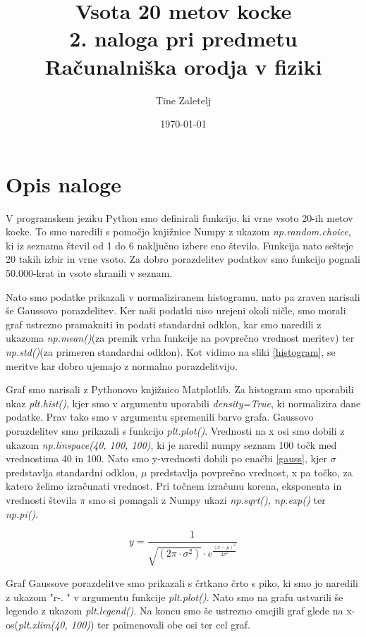 \documentclass[titlepage]{article}
\title{Vsota 20 metov kocke\\\large 2. naloga pri predmetu Računalniška orodja v fiziki}
\author{Tine Zaletelj}
\date{\today}
\begin{document}
\maketitle

\section{Opis naloge}
V programskem jeziku Python smo definirali funkcijo, ki vrne vsoto 20-ih metov kocke. To smo naredili s pomočjo knjižnice Numpy z ukazom {\it np.random.choice}, ki iz seznama števil od 1 do 6 naključno izbere eno število. Funkcija nato sešteje 20 takih izbir in vrne vsoto. Za dobro porazdelitev podatkov smo funkcijo pognali 50.000-krat in vsote shranili v seznam.

Nato smo podatke prikazali v normaliziranem histogramu, nato pa zraven narisali še Gaussovo porazdelitev. Ker naši podatki niso urejeni okoli ničle, smo morali graf ustrezno pramakniti in podati standardni odklon, kar smo naredili z ukazoma {\it np.mean()}(za premik vrha funkcije na povprečno vrednost meritev) ter {\it np.std()}(za primeren standardni odklon). Kot vidimo na sliki \ref{histogram}, se meritve kar dobro ujemajo z normalno porazdelitvijo.

Graf smo narisali z Pythonovo knjižnico Matplotlib. Za histogram smo uporabili ukaz {\it plt.hist()}, kjer smo v argumentu uporabili {\it density=True}, ki normalizira dane podatke. Prav tako smo v argumentu spremenili barvo grafa. Gaussovo porazdelitev smo prikazali s funkcijo {\it plt.plot()}. Vrednosti na x osi smo dobili z ukazom {\it np.linspace(40, 100, 100)}, ki je naredil numpy seznam 100 točk med vrednostima 40 in 100. Nato smo y-vrednosti dobili po enačbi \ref{gauss}, kjer $\sigma$ predstavlja standardni odklon, $\mu$ predstavlja povprečno vrednost, x pa točko, za katero želimo izračunati vrednost. Pri točnem izračunu korena, eksponenta in vrednosti števila $\pi$ smo si pomagali z Numpy ukazi {\it np.sqrt(), np.exp()} ter {\it np.pi()}.

\begin{equation}
    y = \frac{1}{\sqrt{(2\pi\cdot\sigma^2)}\cdot e^\frac{(x-\mu)^2}{2\sigma^2}}\label{gauss}
\end{equation}

Graf Gaussove porazdelitve smo prikazali s črtkano črto s piko, ki smo jo naredili z ukazom "r-. " v argumentu funkcije {\it plt.plot()}. Nato smo na grafu ustvarili še legendo z ukazom {\it plt.legend()}. Na koncu smo še ustrezno omejili graf glede na x-os({\it plt.xlim(40, 100)}) ter poimenovali obe osi ter cel graf.
\end{document}
